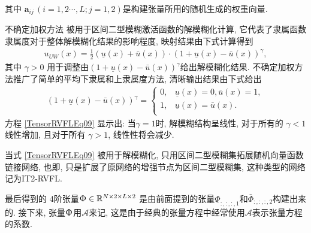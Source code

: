 其中 $\bm {a} _{ij} \,(i=1,2\cdots,L; j=1,2)$是构建张量所用的随机生成的权重向量.
\begin{remark}
不确定加权方法\cite{RunklerCoupland2018-6356} 被用于区间二型模糊激活函数的解模糊化计算,
它代表了隶属函数隶属度对于整体解模糊化结果的影响程度, 映射结果由下式计算得到
\begin{align} \label{TensorRVFLEq08}
    u_{UW} (x) =\frac 1 2 (\underline u(x) + \bar u(x))\cdot (1+\underline u(x)-\bar u(x))^\gamma,
\end{align}
其中 $\gamma > 0$ 用于调整由$(1+\underline u(x)-\bar u(x))^\gamma$给出解模糊化结果.
不确定加权方法推广了简单的平均下隶属和上隶属度方法, 清晰输出结果由下式给出
\begin{align} \label{TensorRVFLEq09}
  (1+\underline u(x)-\bar u(x))^\gamma=
  \left\{
  \begin{array} {ll}
    0,& \underline u(x)=0, \bar u(x)=1,\\
    1,&\underline u(x)=\bar u(x).\\
  \end{array}
  \right.
\end{align}
方程 \eqref{TensorRVFLEq09} 显示出: 当$\gamma =1$时, 解模糊结构呈线性, 对于所有的 $\gamma<1$ 线性增加, 且对于所有 $\gamma>1$, 线性性将会减少.
\end{remark}
\begin{remark}
当式 \eqref{TensorRVFLEq09} 被用于解模糊化, 只用区间二型模糊集拓展随机向量函数链接网络, 也即,  只是扩展了原网络的增强节点为区间二型模糊集,  这种类型的网络记为IT2-RVFL.
\end{remark}

最后得到的 4阶张量$\Upphi \in \mathbb R^{N\times 2\times L \times 2}$ 是由前面提到的张量$\underline\Phi_{:,:,:,1} $和$\bar \Phi_{:,:,:,2} $构建出来的.
接下来, 张量$\Upphi$用$\mathcal A$来记,  这是由于经典的张量方程中经常使用$\mathcal A$表示张量方程的系数.

